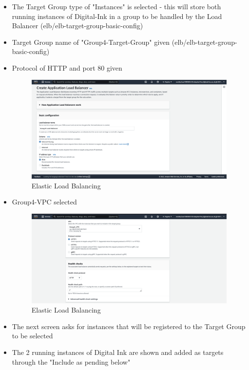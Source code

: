 \begin{itemize}
	\item The Target Group type of "Instances" is selected - this will store both running instances of Digital-Ink in a group
	      to be handled by the Load Balancer (elb/elb-target-group-basic-config)
	\item Target Group name of "Group4-Target-Group" given (elb/elb-target-group-basic-config)
	\item Protocol of HTTP and port 80 given \begin{figure}[!htbp]
	      \centering
	      \includegraphics[width=\textwidth]{resources/elb/elb-basic-config.png}
	      \caption{Elastic Load Balancing}
	      \label{fig:elb-basic-config}
	\end{figure}
	\item Group4-VPC selected \begin{figure}[!htbp]
	      \centering
	      \includegraphics[width=\textwidth]{resources/elb/elb-vpc.png}
	      \caption{Elastic Load Balancing}
	      \label{fig:elb-vpc}
	\end{figure}
	\item The next screen asks for instances that will be registered to the Target Group to be selected
	\item The 2 running instances of Digital Ink are shown and added as targets through the "Include as pending below"

\end{itemize}
